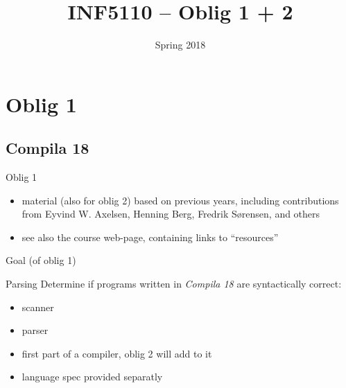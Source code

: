 \documentclass{beamer}
\date{Spring 2018}
\title{INF5110 -- Oblig 1 + 2}
\renewcommand{\maketitle}{}
\begin{document}
\maketitle
\chapter{Oblig 1}
\label{sec:orgf6f4f97}



\section{Compila 18}
\label{sec:orgca52c7c}

\begin{frame}[label={sec:org39ce603}]{Oblig 1}
\begin{itemize}
\item material (also for oblig 2) based on previous years, including contributions from Eyvind
W. Axelsen, Henning Berg, Fredrik Sørensen, and others
\end{itemize}


\begin{itemize}
\item see also the course web-page, containing links to ``resources''
\end{itemize}
\end{frame}


\begin{frame}[label={sec:org2488165}]{Goal (of oblig 1)}
\begin{block}{Parsing}
Determine if programs written in \emph{Compila 18} are syntactically correct: 

\begin{itemize}
\item scanner
\item parser
\end{itemize}
\end{block}


\begin{itemize}
\item first part of a compiler, oblig 2 will add to it
\item language spec provided separatly
\end{itemize}
\end{frame}
\end{document}
